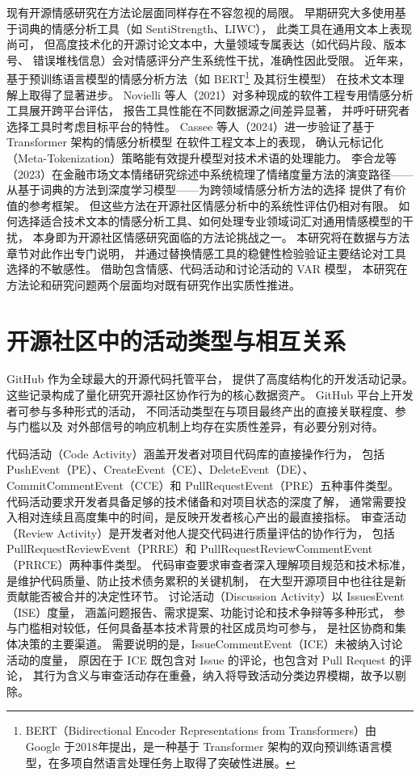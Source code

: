 现有开源情感研究在方法论层面同样存在不容忽视的局限。
早期研究大多使用基于词典的情感分析工具（如 SentiStrength、LIWC），
此类工具在通用文本上表现尚可，
但高度技术化的开源讨论文本中，大量领域专属表达（如代码片段、版本号、
错误堆栈信息）会对情感评分产生系统性干扰，准确性因此受限。
近年来，基于预训练语言模型的情感分析方法（如 BERT\footnote{BERT（Bidirectional Encoder Representations from Transformers）由 Google 于2018年提出，是一种基于 Transformer 架构的双向预训练语言模型，在多项自然语言处理任务上取得了突破性进展。} 及其衍生模型）
在技术文本理解上取得了显著进步。
Novielli 等人（2021）对多种现成的软件工程专用情感分析工具展开跨平台评估，
报告工具性能在不同数据源之间差异显著，
并呼吁研究者选择工具时考虑目标平台的特性\cite{novielli2021assessment}。
Cassee 等人（2024）进一步验证了基于 Transformer 架构的情感分析模型
在软件工程文本上的表现，
确认元标记化（Meta-Tokenization）策略能有效提升模型对技术术语的处理能力\cite{cassee2024transformers}。
李合龙等（2023）在金融市场文本情绪研究综述中系统梳理了情绪度量方法的演变路径——
从基于词典的方法到深度学习模型——为跨领域情感分析方法的选择
提供了有价值的参考框架\cite{li2023sentiment}。
但这些方法在开源社区情感分析中的系统性评估仍相对有限。
如何选择适合技术文本的情感分析工具、如何处理专业领域词汇对通用情感模型的干扰，
本身即为开源社区情感研究面临的方法论挑战之一。
本研究将在数据与方法章节对此作出专门说明，
并通过替换情感工具的稳健性检验验证主要结论对工具选择的不敏感性。
借助包含情感、代码活动和讨论活动的 VAR 模型，
本研究在方法论和研究问题两个层面均对既有研究作出实质性推进。

\section{开源社区中的活动类型与相互关系}

GitHub 作为全球最大的开源代码托管平台，
提供了高度结构化的开发活动记录。
这些记录构成了量化研究开源社区协作行为的核心数据资产\cite{alami2024sustainability}。
GitHub 平台上开发者可参与多种形式的活动，
不同活动类型在与项目最终产出的直接关联程度、参与门槛以及
对外部信号的响应机制上均存在实质性差异，有必要分别对待。

代码活动（Code Activity）涵盖开发者对项目代码库的直接操作行为，
包括 PushEvent（PE）、CreateEvent（CE）、DeleteEvent（DE）、CommitCommentEvent（CCE）和 PullRequestEvent（PRE）五种事件类型。
代码活动要求开发者具备足够的技术储备和对项目状态的深度了解，
通常需要投入相对连续且高度集中的时间，是反映开发者核心产出的最直接指标。
审查活动（Review Activity）是开发者对他人提交代码进行质量评估的协作行为，
包括 PullRequestReviewEvent（PRRE）和 PullRequestReviewCommentEvent（PRRCE）两种事件类型。
代码审查要求审查者深入理解项目规范和技术标准，
是维护代码质量、防止技术债务累积的关键机制，
在大型开源项目中也往往是新贡献能否被合并的决定性环节。
讨论活动（Discussion Activity）以 IssuesEvent（ISE）度量，
涵盖问题报告、需求提案、功能讨论和技术争辩等多种形式，
参与门槛相对较低，任何具备基本技术背景的社区成员均可参与，
是社区协商和集体决策的主要渠道。
需要说明的是，IssueCommentEvent（ICE）未被纳入讨论活动的度量，
原因在于 ICE 既包含对 Issue 的评论，也包含对 Pull Request 的评论，
其行为含义与审查活动存在重叠，纳入将导致活动分类边界模糊，故予以剔除。

